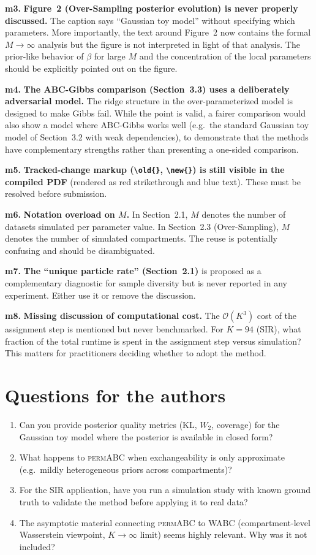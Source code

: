 \documentclass[11pt,a4paper]{article}
\newcommand{\minor}[1]{\textbf{\color{orange!80!black}m#1.}}
\begin{document}
\minor{3} \textbf{Figure~2 (Over-Sampling posterior evolution) is never properly discussed.} The caption says ``Gaussian toy model'' without specifying which parameters. More importantly, the text around Figure~2 now contains the formal $M \to \infty$ analysis but the figure is not interpreted in light of that analysis. The prior-like behavior of $\beta$ for large $M$ and the concentration of the local parameters should be explicitly pointed out on the figure.

\minor{4} \textbf{The ABC-Gibbs comparison (Section~3.3) uses a deliberately adversarial model.} The ridge structure in the over-parameterized model is designed to make Gibbs fail. While the point is valid, a fairer comparison would also show a model where ABC-Gibbs works well (e.g.\ the standard Gaussian toy model of Section~3.2 with weak dependencies), to demonstrate that the methods have complementary strengths rather than presenting a one-sided comparison.

\minor{5} \textbf{Tracked-change markup (\texttt{\textbackslash old\{\}}, \texttt{\textbackslash new\{\}}) is still visible in the compiled PDF} (rendered as red strikethrough and blue text). These must be resolved before submission.

\minor{6} \textbf{Notation overload on $M$.} In Section~2.1, $M$ denotes the number of datasets simulated per parameter value. In Section~2.3 (Over-Sampling), $M$ denotes the number of simulated compartments. The reuse is potentially confusing and should be disambiguated.

\minor{7} \textbf{The ``unique particle rate'' (Section~2.1)} is proposed as a complementary diagnostic for sample diversity but is never reported in any experiment. Either use it or remove the discussion.

\minor{8} \textbf{Missing discussion of computational cost.} The $\mathcal{O}(K^3)$ cost of the assignment step is mentioned but never benchmarked. For $K = 94$ (SIR), what fraction of the total runtime is spent in the assignment step versus simulation? This matters for practitioners deciding whether to adopt the method.

\section*{Questions for the authors}

\begin{enumerate}[nosep]
    \item Can you provide posterior quality metrics (KL, $W_2$, coverage) for the Gaussian toy model where the posterior is available in closed form?
    \item What happens to \textsc{permABC} when exchangeability is only approximate (e.g.\ mildly heterogeneous priors across compartments)?
    \item For the SIR application, have you run a simulation study with known ground truth to validate the method before applying it to real data?
    \item The asymptotic material connecting \textsc{permABC} to WABC (compartment-level Wasserstein viewpoint, $K \to \infty$ limit) seems highly relevant. Why was it not included?
\end{enumerate}
\end{document}
